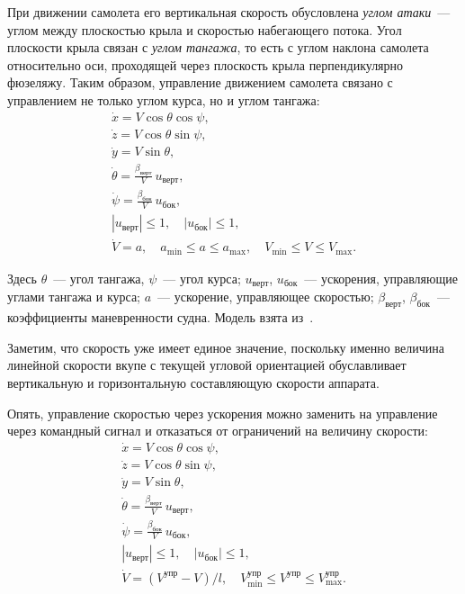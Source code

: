 \documentclass[a4paper,12pt]{article}
\numberwithin{figure}{subsubsection}
\begin{document}
При движении самолета его вертикальная скорость обусловлена \textit{углом атаки}~--- углом между плоскостью крыла и скоростью набегающего потока. Угол плоскости крыла связан с \textit{углом тангажа}, то есть с углом наклона самолета относительно оси, проходящей через плоскость крыла перпендикулярно фюзеляжу. Таким образом, управление движением самолета связано с управлением не только углом курса, но и углом тангажа:
\begin{equation*}
  \begin{array}{l}
    \dot x = V \cos \theta \cos \psi, \\[0.75ex]
    \dot z = V \cos \theta \sin \psi, \\[0.75ex]
    \dot y = V \sin \theta, \\[0.75ex]
    \dot \theta = \frac{\beta_\text{верт}}{V} \, u_\text{верт}, \\[0.75ex]
    \dot \psi   = \frac{\beta_\text{бок}}{V} \, u_\text{бок}, \\[0.75ex]
    |u_\text{верт}| \leqslant 1, 
      \quad |u_\text{бок}| \leqslant 1, \\[0.75ex]
    \dot V = a, \quad  
      a_{\min} \leqslant a \leqslant a_{\max},
      \quad V_{\min} \leqslant V \leqslant V_{\max}.
  \end{array}
\end{equation*}

Здесь $\theta$~--- угол тангажа, $\psi$~--- угол курса; $u_\text{верт}$, $u_\text{бок}$~--- ускорения, управляющие углами тангажа и курса; $a$~--- ускорение, управляющее скоростью; $\beta_\text{верт}$, $\beta_\text{бок}$~--- коэффициенты маневренности судна. Модель взята из~\cite{bib:GOST}.

Заметим, что скорость уже имеет единое значение, поскольку именно величина линейной скорости вкупе с текущей угловой ориентацией обуславливает вертикальную и горизонтальную составляющую скорости аппарата.

Опять, управление скоростью через ускорения можно заменить на управление через командный сигнал и отказаться от ограничений на величину скорости:
\begin{equation*}
  \begin{array}{l}
    \dot x = V \cos \theta \cos \psi, \\[0.75ex]
    \dot z = V \cos \theta \sin \psi, \\[0.75ex]
    \dot y = V \sin \theta, \\[0.75ex]
    \dot \theta = \frac{\beta_\text{верт}}{V} \, u_\text{верт}, \\[0.75ex]
    \dot \psi   = \frac{\beta_\text{бок}}{V} \, u_\text{бок}, \\[0.75ex]
    |u_\text{верт}| \leqslant 1, 
      \quad |u_\text{бок}| \leqslant 1, \\[0.75ex]
    \dot V = (V^\text{упр} - V) / l, \quad  
      V^\text{упр}_{\min} \leqslant V^\text{упр} \leqslant V^\text{упр}_{\max}.
  \end{array}
\end{equation*}
\end{document}
